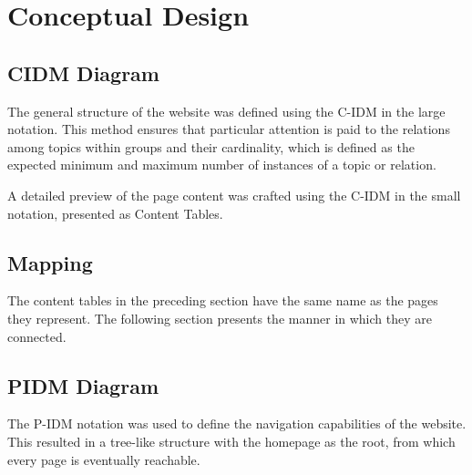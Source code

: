 \section{Conceptual Design}
\subsection{CIDM Diagram}
The general structure of the website was defined using the C-IDM in the large notation. 
This method ensures that particular attention is paid to the relations among topics within groups and their cardinality, 
which is defined as the expected minimum and maximum number of instances of a topic or relation.


A detailed preview of the page content was crafted using the C-IDM in the small notation, presented as Content Tables.


\subsection{Mapping}
The content tables in the preceding section have the same name as the pages they represent. 
The following section presents the manner in which they are connected.

\subsection{PIDM Diagram}
The P-IDM notation was used to define the navigation capabilities of the website. 
This resulted in a tree-like structure with the homepage as the root, from which every page is eventually reachable.

